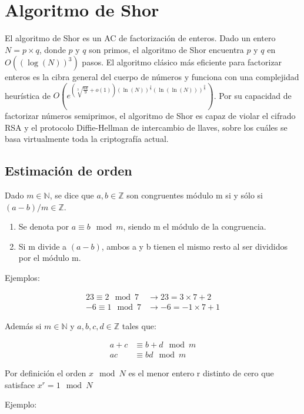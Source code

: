 \chapter{Algoritmo de Shor}
El algoritmo de Shor es un AC de factorización de enteros. Dado un entero $N=p \times q$, donde $p$ y $q$ son primos, el algoritmo de Shor encuentra $p$ y $q$ en $O((\log(N))^3)$ pasos. El algoritmo clásico más eficiente para factorizar enteros es la cibra general del cuerpo de números y funciona con una complejidad heurística de $O(e^{(\sqrt[3]{\frac{64}{9}}+o(1))(\ln(N))^{\frac{1}{3}}(\ln(\ln(N)))^{\frac{2}{3}}})$. Por su capacidad de factorizar números semiprimos, el algoritmo de Shor es capaz de violar el cifrado RSA y el protocolo Diffie-Hellman de intercambio de llaves, sobre los cuáles se basa virtualmente toda la criptografía actual.

\section{Estimación de orden}

Dado $m \in \mathds{N}$, se dice que $a,b \in \mathds{Z}$ son congruentes módulo m si y sólo si $(a-b)/m \in \mathds{Z}$.

\begin{enumerate}
    \item Se denota por $a \equiv b \mod m$, siendo m el módulo de la congruencia.
    \item Si m divide a $(a-b)$, ambos a y b tienen el mismo resto al ser divididos por el módulo m.
\end{enumerate}

 Ejemplos:

\begin{align*}
    23 \equiv 2 \mod 7 &\rightarrow 23 = 3 \times 7 + 2 \\
    -6 \equiv 1 \mod 7 &\rightarrow -6 = -1 \times 7 +1
\end{align*}

 Además si $m \in \mathds{N}$ y $a,b,c,d \in \mathds{Z}$ tales que:

\begin{align*}
    a+c &\equiv b+d \mod m \\
    a c &\equiv b d \mod m
\end{align*}

 Por definición el orden $x \mod N$ es el menor entero r distinto de cero que satisface $x^r = 1 \mod N$
 
Ejemplo:

